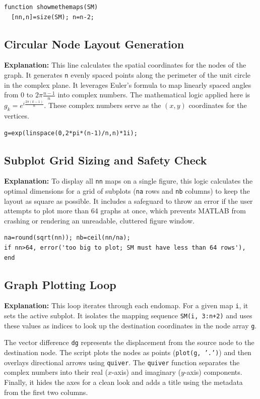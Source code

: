 \begin{lstlisting}
function showmethemaps(SM)
  [nn,n]=size(SM); n=n-2;
\end{lstlisting}

\subsection{Circular Node Layout Generation}
\textbf{Explanation:} This line calculates the spatial coordinates for the nodes of the graph. It generates \texttt{n} evenly spaced points along the perimeter of the unit circle in the complex plane. It leverages Euler's formula to map linearly spaced angles from $0$ to $2\pi \frac{n-1}{n}$ into complex numbers. The mathematical logic applied here is $g_k = e^{i \frac{2\pi (k-1)}{n}}$. These complex numbers serve as the $(x, y)$ coordinates for the vertices.

\begin{lstlisting}
g=exp(linspace(0,2*pi*(n-1)/n,n)*1i);
\end{lstlisting}

\subsection{Subplot Grid Sizing and Safety Check}
\textbf{Explanation:} To display all \texttt{nn} maps on a single figure, this logic calculates the optimal dimensions for a grid of subplots (\texttt{na} rows and \texttt{nb} columns) to keep the layout as square as possible. It includes a safeguard to throw an error if the user attempts to plot more than 64 graphs at once, which prevents MATLAB from crashing or rendering an unreadable, cluttered figure window.

\begin{lstlisting}
na=round(sqrt(nn)); nb=ceil(nn/na);
if nn>64, error('too big to plot; SM must have less than 64 rows'), end
\end{lstlisting}

\subsection{Graph Plotting Loop}
\textbf{Explanation:} This loop iterates through each endomap. For a given map \texttt{i}, it sets the active subplot. It isolates the mapping sequence \texttt{SM(i, 3:n+2)} and uses these values as indices to look up the destination coordinates in the node array \texttt{g}. 

The vector difference \texttt{dg} represents the displacement from the source node to the destination node. The script plots the nodes as points (\texttt{plot(g, '.')}) and then overlays directional arrows using \texttt{quiver}. The \texttt{quiver} function separates the complex numbers into their real ($x$-axis) and imaginary ($y$-axis) components. Finally, it hides the axes for a clean look and adds a title using the metadata from the first two columns.

